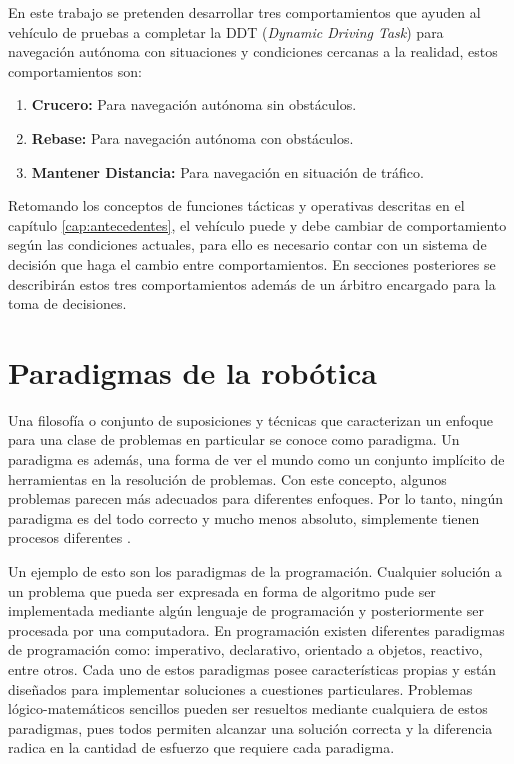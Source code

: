 En este trabajo se pretenden desarrollar tres comportamientos que ayuden al vehículo de pruebas a completar la DDT (\textit{Dynamic Driving Task}) para navegación autónoma con situaciones y condiciones cercanas a la realidad, estos comportamientos son:
\begin{enumerate}
    \item \textbf{Crucero:} Para navegación autónoma sin obstáculos.
    \item \textbf{Rebase:} Para navegación autónoma con obstáculos.
    \item \textbf{Mantener Distancia:} Para navegación en situación de tráfico.
\end{enumerate}
Retomando los conceptos de funciones tácticas y operativas descritas en el capítulo \ref{cap:antecedentes}, el vehículo puede y debe cambiar de comportamiento según las condiciones actuales, para ello es necesario contar con un sistema de decisión que haga el cambio entre comportamientos. En secciones posteriores se describirán estos tres comportamientos además de un árbitro encargado para la toma de decisiones.

\section{Paradigmas de la robótica} \label{sec:paradigmas_de_la_robótica}

Una filosofía o conjunto de suposiciones y técnicas que caracterizan un enfoque para una clase de problemas en particular se conoce como paradigma. Un paradigma es además, una forma de ver el mundo como un conjunto implícito de herramientas en la resolución de problemas. Con este concepto, algunos problemas parecen más adecuados para diferentes enfoques. Por lo tanto, ningún paradigma es del todo correcto y mucho menos absoluto, simplemente tienen procesos diferentes \cite{murphy2019introduction}.


Un ejemplo de esto son los paradigmas de la programación. Cualquier solución a un problema que pueda ser expresada en forma de algoritmo pude ser implementada mediante algún lenguaje de programación y posteriormente ser procesada por una computadora. En programación existen diferentes paradigmas de programación como: imperativo, declarativo, orientado a objetos, reactivo, entre otros. Cada uno de estos paradigmas posee características propias y están diseñados para implementar soluciones a cuestiones particulares. Problemas lógico-matemáticos sencillos pueden ser resueltos mediante cualquiera de estos paradigmas, pues todos permiten alcanzar una solución correcta y la diferencia radica en la cantidad de esfuerzo que requiere cada paradigma.

